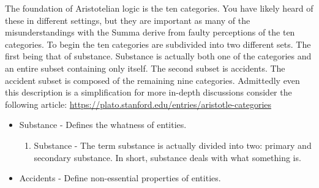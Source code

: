 \documentclass{ucetd}
\begin{document}
The foundation of Aristotelian logic is the ten categories. You have likely heard of these in different settings, but they are important as many of the misunderstandings with the Summa derive from faulty perceptions of the ten categories. To begin the ten categories are subdivided into two different sets. The first being that of substance. Substance is actually both one of the categories and an entire subset containing only itself. The second subset is accidents. The accident subset is composed of the remaining nine categories. Admittedly even this description is a simplification for more in-depth discussions consider the following article: \href{https://plato.stanford.edu/entries/aristotle-categories}{https://plato.stanford.edu/entries/aristotle-categories} 
\setcounter{categories}{0}
\begin{itemize}
    \item[A] Substance - Defines the whatness of entities.
    \begin{enumerate}
        \setcounter{enumi}{\value{categories}}
        \item Substance - The term substance is actually divided into two: primary and secondary substance. In short, substance deals with what something is.
        \setcounter{categories}{\value{enumi}}
    \end{enumerate}
    \item[B] Accidents - Define non-essential properties of entities.

\end{itemize}
\end{document}
